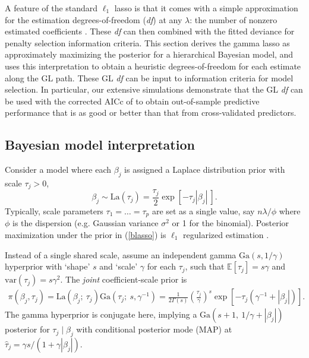 \documentclass[12pt]{article}
\newcommand{\mr}[1]{\mathrm{#1}}
\newcommand{\ds}[1]{\mathds{#1}}
\begin{document}
A feature of the standard $\ell_1$ lasso is that it comes with a
simple approximation for the estimation degrees-of-freedom (\textit{df}) at
any $\lambda$: the number of nonzero estimated coefficients
\citep[see][]{zou_degrees_2007}.  These \textit{df} can then combined with the fitted
deviance for penalty selection  information criteria.
This section derives the gamma lasso as approximately maximizing the posterior
for a hierarchical Bayesian model, and uses this
interpretation to obtain a heuristic degrees-of-freedom for each estimate
along the GL path.  These GL \textit{df} can  be input to information criteria
for model selection. In particular, our extensive simulations demonstrate that the GL
\textit{df} can be used with  the corrected AICc of
\citet{hurvich_regression_1989}  to obtain out-of-sample predictive
performance that is as good or better than that from cross-validated
predictors.


\subsection{Bayesian model interpretation}

Consider a model where each $\beta_j$ is
assigned a Laplace distribution prior with scale $\tau_j>0$,
\begin{equation}\label{blasso}
\beta_j \sim \mr{La}\left(\tau_j\right) =
\frac{\tau_j}{2}\exp\left[ -\tau_j|\beta_j| ~\right].
\end{equation}
Typically, scale parameters $\tau_1 =
\ldots = \tau_p$ are set as a single value, say $n\lambda/\phi$ where
 $\phi$ is the dispersion (e.g. Gaussian variance
$\sigma^2$ or 1 for the binomial).   Posterior
maximization under the prior in (\ref{blasso}) is $\ell_1$ regularized estimation \citep[e.g.,][]{park_bayesian_2008}.

Instead of a single shared scale, assume an independent gamma
$\mr{Ga}(s,1/\gamma)$ hyperprior with `shape' $s$ and `scale' $\gamma$ for
each $\tau_j$, such that $\ds{E}[\tau_j] = s\gamma$ and $\mr{var}(\tau_j) =
s\gamma^2$.  The {\it joint} coefficient-scale prior is
\begin{align}\label{glprior}
\pi(\beta_j,\tau_j) = \mr{La}\left(\beta_j ;~ \tau_j\right)
\mr{Ga}\left(\tau_j;~ s,\gamma^{-1}\right) = \frac{ 1}{2\Gamma({s})} 
\left(\frac{\tau_j}{\gamma}\right)^{s}
               \exp\left[-\tau_j(\gamma^{-1}+|\beta_j|)\right].
\end{align}
The gamma hyperprior is conjugate here, implying a $\mr{Ga}\left(s+1, ~1/\gamma +
|\beta_j|\right)$ posterior for $\tau_j \mid \beta_j$ with conditional
posterior mode (MAP) at $\hat\tau_j = \gamma s/(1 + \gamma |\beta_j|)$.
\end{document}
